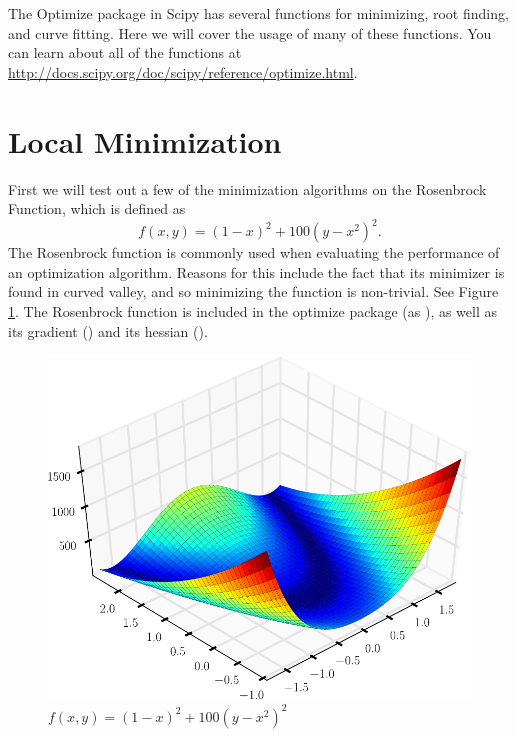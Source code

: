 \label{lab:Optimization1}

The Optimize package in Scipy has several functions for minimizing, root finding, and curve fitting. Here we will cover the usage of many of these functions.
You can learn about all of the functions at \url{http://docs.scipy.org/doc/scipy/reference/optimize.html}.

\section*{Local Minimization}

First we will test out a few of the minimization algorithms on the Rosenbrock Function, which is defined as
\[
f(x,y) = (1-x)^2 + 100(y-x^2)^2.
\]
The Rosenbrock function is commonly used when evaluating the performance of an optimization algorithm.
Reasons for this include the fact that its minimizer  is found in  curved valley, and so minimizing the function is non-trivial.
See Figure \ref{opt:rosenbrock}.
The Rosenbrock function is included in the optimize package (as ), as well as its gradient () and its hessian ().

\begin{figure}
\includegraphics[width=\textwidth]{Rosenbrock.pdf}
\caption{$f(x,y) = (1-x)^2 + 100(y-x^2)^2$}
\label{opt:rosenbrock}
\end{figure}

